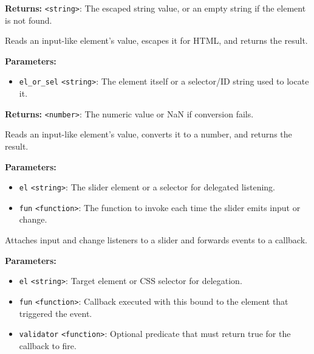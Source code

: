 \documentclass[12pt,a4paper]{article}
\begin{document}
\noindent \textbf{Returns:} \texttt{<string>}: The escaped string value, or an empty string if the element is not found.

\noindent Reads an input-like element’s value, escapes it for HTML, and returns the result.

\vspace{5mm}
\noindent {}


\noindent \textbf{Parameters:}
\begin{itemize}
  \item \texttt{el\_or\_sel} \texttt{<string>}: The element itself or a selector/ID string used to locate it.
\end{itemize}

\noindent \textbf{Returns:} \texttt{<number>}: The numeric value or \textasciigrave{}NaN\textasciigrave{} if conversion fails.

\noindent Reads an input-like element’s value, converts it to a number, and returns the result.

\vspace{5mm}
\noindent {}


\noindent \textbf{Parameters:}
\begin{itemize}
  \item \texttt{el} \texttt{<string>}: The slider element or a selector for delegated listening.
  \item \texttt{fun} \texttt{<function>}: The function to invoke each time the slider emits \textasciigrave{}input\textasciigrave{} or \textasciigrave{}change\textasciigrave{}.
\end{itemize}

\noindent Attaches \textasciigrave{}input\textasciigrave{} and \textasciigrave{}change\textasciigrave{} listeners to a slider and forwards events to a callback.

\vspace{5mm}
\noindent {}


\noindent \textbf{Parameters:}
\begin{itemize}
  \item \texttt{el} \texttt{<string>}: Target element or CSS selector for delegation.
  \item \texttt{fun} \texttt{<function>}: Callback executed with \textasciigrave{}this\textasciigrave{} bound to the element that triggered the event.
  \item \texttt{validator} \texttt{<function>}: Optional predicate that must return \textasciigrave{}true\textasciigrave{} for the callback to fire.
\end{itemize}
\end{document}

